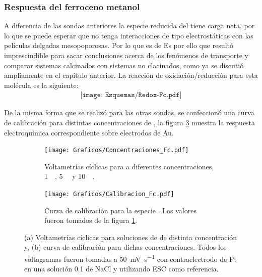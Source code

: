 {{		\subsubsection*{Respuesta del ferroceno metanol}
 	 	 
 	 	  A diferencia de las sondas anteriores la especie reducida del \fc\space tiene carga neta, por lo que se puede esperar que no tenga interacciones de tipo electrostáticas con las películas delgadas mesopoporosas. Por lo que es de  Es por ello que resultó imprescindible para sacar conclusiones acerca de los fenómenos de transporte y comparar sistemas calcinados con sistemas no clacinados, como ya se discutió ampliamente en el capítulo anterior. 
 	 	  La reacción de oxidación/reducción para esta molécula es la siguiente:
 	 				 \begin{equation}
 	 	 				\begin{aligned}
 	 	 				\texttt{[image: Esquemas/Redox-Fc.pdf]}
 	 	 				\end{aligned}
 	 	 			 \end{equation}
 	 	  
 	 	 De la misma forma que se realizó para las otras sondas, se confeccionó una curva de calibración para distintas concentraciones de \fc\space, la figura \ref{Fig:Fc} muestra la respuesta electroquímica correspondiente sobre electrodos de Au.
 	 				
		 		 \begin{figure}[ht]
		 	      \begin{subfigure}[t]{0.495\textwidth}
		          	\texttt{[image: Graficos/Concentraciones\_Fc.pdf]}
		         	\caption{Voltametrías cíclicas para \fc\space a diferentes concentraciones, \SI{1}{\milli\Molar}, \SI{5}{\milli\Molar} y \SI{10}{\milli\Molar}.}
		          	\label{fig:Fc_a}
		      		\end{subfigure}
		      	 \begin{subfigure}[t]{0.495\textwidth}
		          	\texttt{[image: Graficos/Calibracion\_Fc.pdf]}
		         	\caption{Curva de calibración para la especie \fc. Los valores fueron tomados de la figura \ref{fig:Fc_a}.}
		          	\label{fig:Fc_b}
		      		\end{subfigure}
		      	 \caption[Respuesta electroquímica para \fc]{(a) Voltametrías cíclicas para soluciones de \fc\space de distinta concentración y, (b) curva de calibración para dichas concentraciones. Todos los voltagramas fueron tomadas a \SI{50}{\milli\volt\per\second} con contraelectrodo de Pt en una solución \SI{0.1}{\Molar} de NaCl y utilizando ESC como referencia.}
		      	 \label{Fig:Fc}
	      		 \end{figure}

}}
